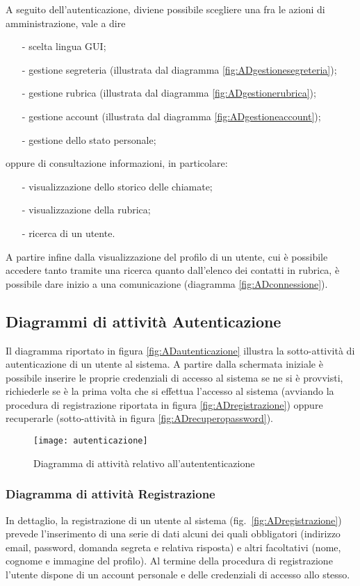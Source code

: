 A seguito dell'autenticazione, diviene possibile scegliere una fra le azioni di amministrazione, vale a dire
\begin{itemize}[noitemsep,nolistsep]
  \item[-] scelta lingua GUI;
  \item[-] gestione segreteria (illustrata dal diagramma \ref{fig:ADgestionesegreteria});
  \item[-] gestione rubrica (illustrata dal diagramma \ref{fig:ADgestionerubrica});
  \item[-] gestione account (illustrata dal diagramma \ref{fig:ADgestioneaccount});
  \item[-] gestione dello stato personale;
\end{itemize}
oppure di consultazione informazioni, in particolare:
\begin{itemize}[noitemsep,nolistsep]
  \item[-] visualizzazione dello storico delle chiamate;
  \item[-] visualizzazione della rubrica;
  \item[-] ricerca di un utente.
\end{itemize}

A partire infine dalla visualizzazione del profilo di un utente, cui è possibile accedere tanto tramite una ricerca quanto dall'elenco dei contatti in rubrica, è possibile dare inizio a una comunicazione (diagramma \vref{fig:ADconnessione}).

\subsection{Diagrammi di attività Autenticazione}
Il diagramma riportato in figura \vref{fig:ADautenticazione} illustra la sotto-attività di autenticazione di un utente al sistema. A partire dalla schermata iniziale è possibile inserire le proprie credenziali di accesso al sistema se ne si è provvisti, richiederle se è la prima volta che si effettua l'accesso al sistema (avviando la procedura di registrazione riportata in figura \ref{fig:ADregistrazione}) oppure recuperarle (sotto-attività in figura \vref{fig:ADrecuperopassword}).

\begin{figure}[H]
\centering
\texttt{[image: autenticazione]}
\caption{Diagramma di attività relativo all'autententicazione}\label{fig:ADautenticazione}
\end{figure}

\subsubsection{Diagramma di attività Registrazione}
In dettaglio, la registrazione di un utente al sistema (fig.~\vref{fig:ADregistrazione}) prevede l'inserimento di una serie di dati alcuni dei quali obbligatori (indirizzo email, password, domanda segreta e relativa risposta) e altri facoltativi (nome, cognome e immagine del profilo). Al termine della procedura di registrazione l'utente dispone di un account personale e delle credenziali di accesso allo stesso.

